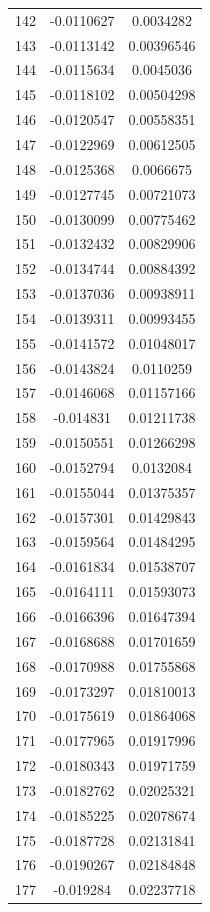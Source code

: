 \documentclass[a4paper, 11pt, oneside]{report}
\begin{document}
{\begin{longtable}{|c|c|c|}
142 & -0.0110627 & 0.0034282  \\
143 & -0.0113142 & 0.00396546 \\
144 & -0.0115634 & 0.0045036  \\
145 & -0.0118102 & 0.00504298 \\
146 & -0.0120547 & 0.00558351 \\
147 & -0.0122969 & 0.00612505 \\
148 & -0.0125368 & 0.0066675  \\
149 & -0.0127745 & 0.00721073 \\
150 & -0.0130099 & 0.00775462 \\
151 & -0.0132432 & 0.00829906 \\
152 & -0.0134744 & 0.00884392 \\
153 & -0.0137036 & 0.00938911 \\
154 & -0.0139311 & 0.00993455 \\
155 & -0.0141572 & 0.01048017 \\
156 & -0.0143824 & 0.0110259  \\
157 & -0.0146068 & 0.01157166 \\
158 & -0.014831  & 0.01211738 \\
159 & -0.0150551 & 0.01266298 \\
160 & -0.0152794 & 0.0132084  \\
161 & -0.0155044 & 0.01375357 \\
162 & -0.0157301 & 0.01429843 \\
163 & -0.0159564 & 0.01484295 \\
164 & -0.0161834 & 0.01538707 \\
165 & -0.0164111 & 0.01593073 \\
166 & -0.0166396 & 0.01647394 \\
167 & -0.0168688 & 0.01701659 \\
168 & -0.0170988 & 0.01755868 \\
169 & -0.0173297 & 0.01810013 \\
170 & -0.0175619 & 0.01864068 \\
171 & -0.0177965 & 0.01917996 \\
172 & -0.0180343 & 0.01971759 \\
173 & -0.0182762 & 0.02025321 \\
174 & -0.0185225 & 0.02078674 \\
175 & -0.0187728 & 0.02131841 \\
176 & -0.0190267 & 0.02184848 \\
177 & -0.019284  & 0.02237718 \\

\end{longtable}}
\end{document}
